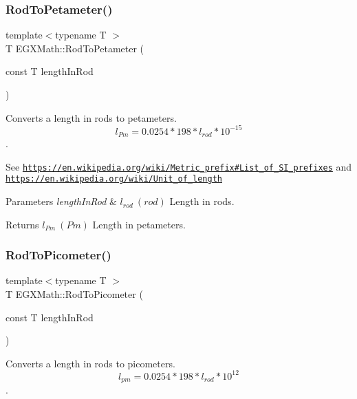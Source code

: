 \subsubsection{\texorpdfstring{Rod\+To\+Petameter()}{RodToPetameter()}}
{\footnotesize\ttfamily template$<$typename T $>$ \\
T E\+G\+X\+Math\+::\+Rod\+To\+Petameter (\begin{DoxyParamCaption}\item[{const T}]{length\+In\+Rod }\end{DoxyParamCaption})}



Converts a length in rods to petameters. \[ l_{Pm}=0.0254 * 198 * l_{rod} * 10^{-15} \]. 

See \href{https://en.wikipedia.org/wiki/Metric_prefix#List_of_SI_prefixes}{\tt https\+://en.\+wikipedia.\+org/wiki/\+Metric\+\_\+prefix\#\+List\+\_\+of\+\_\+\+S\+I\+\_\+prefixes} and \href{https://en.wikipedia.org/wiki/Unit_of_length}{\tt https\+://en.\+wikipedia.\+org/wiki/\+Unit\+\_\+of\+\_\+length} 
\begin{DoxyParams}{Parameters}
{\em length\+In\+Rod} & $ l_{rod}\ (rod)$ Length in rods. \\
\hline
\end{DoxyParams}
\begin{DoxyReturn}{Returns}
$ l_{Pm}\ (Pm)$ Length in petameters. 
\end{DoxyReturn}
\mbox{\label{group___e_g_x_math-_conversions-_length_conversions-_surveyors-_rod-_s_i_ga212e66c6922a0df85714ec8559af8790}} 
\subsubsection{\texorpdfstring{Rod\+To\+Picometer()}{RodToPicometer()}}
{\footnotesize\ttfamily template$<$typename T $>$ \\
T E\+G\+X\+Math\+::\+Rod\+To\+Picometer (\begin{DoxyParamCaption}\item[{const T}]{length\+In\+Rod }\end{DoxyParamCaption})}



Converts a length in rods to picometers. \[ l_{pm}=0.0254 * 198 * l_{rod} * 10^{12} \]. 

